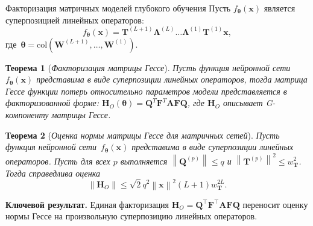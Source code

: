 \documentclass[10pt,pdf,hyperref={unicode}]{beamer}
\newtheorem{rustheorem}{Теорема}
\newcommand{\key}[1]{\textbf{\color{darkgreen}#1}}
\begin{document}
\begin{frame}{Факторизация матричных моделей глубокого обучения}
\justifying
\small
Пусть $f_{\boldsymbol{\theta}}(\mathbf{x})$ является суперпозицией линейных операторов:
\begin{equation*}
    f_{\boldsymbol{\theta}}(\mathbf{x}) = \mathbf{T}^{(L+1)}\boldsymbol{\Lambda}^{(L)}\dots \boldsymbol{\Lambda}^{(1)}\mathbf{T}^{(1)}\mathbf{x},
\end{equation*}
где~$\boldsymbol{\theta} = \mathrm{col}(\mathbf{W}^{(L+1)}, \dots, \mathbf{W}^{(1)}).$

\begin{rustheorem}[\emph{Факторизация матрицы Гессе}]
    \justifying
    Пусть функция нейронной сети~$f_{\boldsymbol{\theta}}(\mathbf{x})$ представима в виде суперпозиции линейных операторов, тогда матрица Гессе функции потерь относительно параметров модели представляется в факторизованной форме:
    $\mathbf{H}_O(\boldsymbol{\theta}) = \mathbf{Q}^{T}\mathbf{F}^{T}\mathbf{A}\mathbf{F}\mathbf{Q}$, где $\mathbf{H}_O$ описывает G-компоненту матрицы Гессе.
\end{rustheorem}

\begin{rustheorem}[\emph{Оценка нормы матрицы Гессе для матричных сетей}]
    \justifying
    Пусть функция нейронной сети~$f_{\boldsymbol{\theta}}(\mathbf{x})$ представима в виде суперпозиции линейных операторов.
    Пусть для всех $p$ выполняется $\left\|\mathbf{Q}^{(p)}\right\| \leqslant q$ и $\left\|\mathbf{T}^{(p)}\right\|^2 \leqslant w_{\mathbf{T}}^2$.
    Тогда справедлива оценка
    \[
        \left\|\mathbf{H}_O\right\| \leqslant \sqrt{2}q^2\left\|\mathbf{x}\right\|^2(L+1)w_{\mathbf{T}}^{2L}.
    \]
\end{rustheorem}

\vspace{0.15em}
\key{Ключевой результат.} Единая факторизация $\mathbf{H}_O=\mathbf{Q}^{\top}\mathbf{F}^{\top}\mathbf{A}\mathbf{F}\mathbf{Q}$ переносит оценку нормы Гессе на произвольную суперпозицию линейных операторов.
\end{frame}
\end{document}
